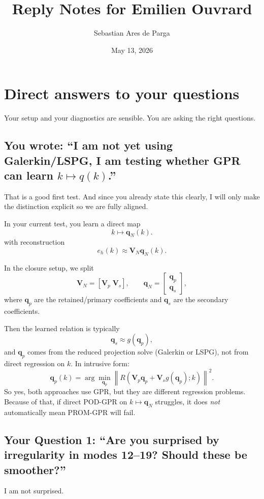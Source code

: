 \documentclass[11pt]{article}
\title{Reply Notes for Emilien Ouvrard}
\author{Sebastian Ares de Parga}
\date{May 13, 2026}
\newcommand{\vect}[1]{\mathbf{#1}}
\newcommand{\mat}[1]{\mathbf{#1}}
\begin{document}
\maketitle

\section*{Direct answers to your questions}

Your setup and your diagnostics are sensible. You are asking the right questions.

\subsection*{You wrote: ``I am not yet using Galerkin/LSPG, I am testing whether GPR can learn $k \mapsto q(k)$.''}

That is a good first test. And since you already state this clearly, I will only make the distinction explicit so we are fully aligned.

In your current test, you learn a direct map
\[
k \mapsto \vect{q}_N(k).
\]
with reconstruction
\[
e_h(k)\approx \mat{V}_N \vect{q}_N(k).
\]

In the closure setup, we split
\[
\mat{V}_N=[\mat{V}_p\;\mat{V}_s],\qquad
\vect{q}_N=
\begin{bmatrix}
\vect{q}_p\\
\vect{q}_s
\end{bmatrix},
\]
where \(\vect{q}_p\) are the retained/primary coefficients and \(\vect{q}_s\) are the secondary coefficients.

Then the learned relation is typically
\[
\vect{q}_s \approx g(\vect{q}_p),
\]
and \(\vect{q}_p\) comes from the reduced projection solve (Galerkin or LSPG), not from direct regression on \(k\). In intrusive form:
\[
\vect{q}_p(k)=\arg\min_{\vect{q}_p}\left\|R\!\left(\mat{V}_p \vect{q}_p+\mat{V}_s g(\vect{q}_p);k\right)\right\|^2.
\]
So yes, both approaches use GPR, but they are different regression problems. Because of that, if direct POD-GPR on \(k\mapsto \vect{q}_N\) struggles, it does \emph{not} automatically mean PROM-GPR will fail.

\subsection*{Your Question 1: ``Are you surprised by irregularity in modes 12--19? Should these be smoother?''}

I am not surprised.
\end{document}
